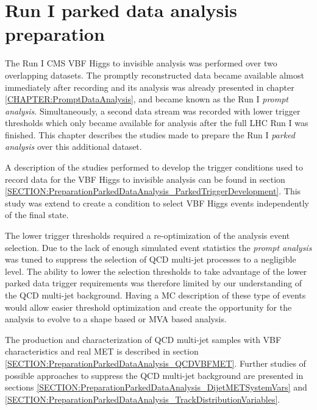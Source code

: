 \chapter{Run I parked data analysis preparation}
\label{CHAPTER:PreparationParkedDataAnalysis}


The Run I \gls{CMS} \gls{VBF} Higgs to invisible analysis was performed over two overlapping datasets. The promptly reconstructed data became available almost immediately after recording and its analysis was already presented in chapter \ref{CHAPTER:PromptDataAnalysis}, and became known as the Run I \textit{prompt analysis}. Simultaneously, a second data stream was recorded with lower trigger thresholds which only became available for analysis after the full \gls{LHC} Run I was finished. This chapter describes the studies made to prepare the Run I \textit{parked analysis} over this additional dataset. 

A description of the studies performed to develop the trigger conditions used to record data for the \gls{VBF} Higgs to invisible analysis can be found in section \ref{SECTION:PreparationParkedDataAnalysis_ParkedTriggerDevelopment}. This study was extend to create a condition to select \gls{VBF} Higgs events independently of the final state.

The lower trigger thresholds required a re-optimization of the analysis event selection. Due to the lack of enough simulated event statistics the \textit{prompt analysis} was tuned to suppress the selection of \gls{QCD} multi-jet processes to a negligible level. The ability to lower the selection thresholds to take advantage of the lower parked data trigger requirements was therefore  limited by our understanding of the \gls{QCD} multi-jet background. Having a \gls{MC} description of these type of events would allow easier threshold optimization and create the opportunity for the analysis to evolve to a shape based or \gls{MVA} based analysis.

The production and characterization of \gls{QCD} multi-jet samples with \gls{VBF} characteristics and real \gls{MET} is described in section \ref{SECTION:PreparationParkedDataAnalysis_QCDVBFMET}. Further studies of possible approaches to suppress the \gls{QCD} multi-jet background are presented in sections \ref{SECTION:PreparationParkedDataAnalysis_DijetMETSystemVars} and \ref{SECTION:PreparationParkedDataAnalysis_TrackDistributionVariables}.

